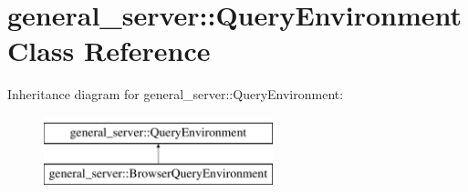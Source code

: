 \hypertarget{classgeneral__server_1_1QueryEnvironment}{\section{general\-\_\-server\-:\-:\-Query\-Environment \-Class \-Reference}
\label{classgeneral__server_1_1QueryEnvironment}
}
\-Inheritance diagram for general\-\_\-server\-:\-:\-Query\-Environment\-:\begin{figure}[H]
\begin{center}
\leavevmode
\includegraphics[height=2.000000cm]{classgeneral__server_1_1QueryEnvironment}
\end{center}
\end{figure}
